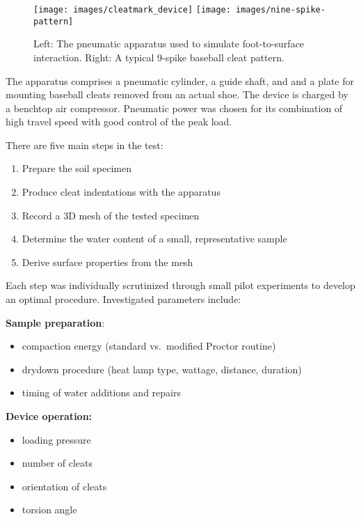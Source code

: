 \documentclass[
  letterpaper,
  openany]{book}
\providecommand{\tightlist}{%
  \setlength{\itemsep}{0pt}\setlength{\parskip}{0pt}}
\begin{document}
\begin{figure}
\texttt{[image: images/cleatmark\_device]} \texttt{[image: images/nine-spike-pattern]} \caption[Pneumatic cleat-mark testing device]{Left: The pneumatic apparatus used to simulate foot-to-surface interaction. Right: A typical 9-spike baseball cleat pattern.}\label{fig:cleat-mark-device}
\end{figure}

The apparatus comprises a pneumatic cylinder, a guide shaft, and and a plate for mounting baseball cleats removed from an actual shoe.
The device is charged by a benchtop air compressor. Pneumatic power was chosen for its combination of high travel speed with good control of the peak load.

There are five main steps in the test:

\begin{enumerate}
\def\labelenumi{\arabic{enumi}.}
\tightlist
\item
  Prepare the soil specimen
\item
  Produce cleat indentations with the apparatus
\item
  Record a 3D mesh of the tested specimen
\item
  Determine the water content of a small, representative sample
\item
  Derive surface properties from the mesh
\end{enumerate}

Each step was individually scrutinized through small pilot experiments to develop an optimal procedure. Investigated parameters include:

\textbf{Sample preparation}:

\begin{itemize}
\tightlist
\item
  compaction energy (standard vs.~modified Proctor routine)
\item
  drydown procedure (heat lamp type, wattage, distance, duration)
\item
  timing of water additions and repairs
\end{itemize}

\textbf{Device operation:}

\begin{itemize}
\tightlist
\item
  loading pressure
\item
  number of cleats
\item
  orientation of cleats
\item
  torsion angle
\end{itemize}
\end{document}
